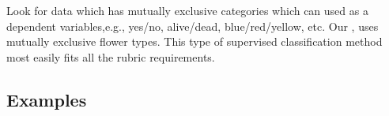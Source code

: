 \documentclass[letterpaper,10pt,english]{jupyterBook}
\begin{document}
\begin{sphinxShadowBox}

\sphinxAtStartPar
Look for data which has mutually exclusive categories which can used as a dependent variables,e.g., yes/no, alive/dead, blue/red/yellow, etc. Our , uses mutually exclusive flower types. This type of supervised classification method most easily fits all the rubric requirements.
\end{sphinxShadowBox}


\subsection{Examples}
\label{\detokenize{task1:examples}}\label{\detokenize{task1:task1-examples}}
\end{document}
